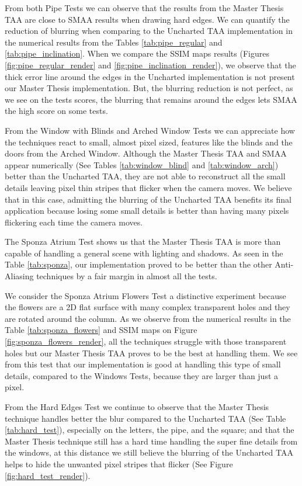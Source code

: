 \documentclass{cslthse-msc}
\begin{document}
From both Pipe Tests we can observe that the results from the Master Thesis TAA are close to SMAA results when drawing hard edges. We can quantify the reduction of blurring when comparing to the Uncharted TAA implementation in the numerical results from the Tables \ref{tab:pipe_regular} and \ref{tab:pipe_inclination}. When we compare the SSIM maps results (Figures \ref{fig:pipe_regular_render} and \ref{fig:pipe_inclination_render}), we observe that the thick error line around the edges in the Uncharted implementation is not present our Master Thesis implementation. But, the blurring reduction is not perfect, as we see on the tests scores, the blurring that remains around the edges lets SMAA the high score on some tests.

From the Window with Blinds and Arched Window Tests we can appreciate how the techniques react to small, almost pixel sized, features like the blinds and the doors from the Arched Window. Although the Master Thesis TAA and SMAA appear numerically (See Tables \ref{tab:window_blind} and \ref{tab:window_arch}) better than the Uncharted TAA, they are not able to reconstruct all the small details leaving pixel thin stripes that flicker when the camera moves. We believe that in this case, admitting the blurring of the Uncharted TAA benefits its final application because losing some small details is better than having many pixels flickering each time the camera moves.

The Sponza Atrium Test shows us that the Master Thesis TAA is more than capable of handling a general scene with lighting and shadows. As seen in the Table \ref{tab:sponza}, our implementation proved to be better than the other Anti-Aliasing techniques by a fair margin in almost all the tests.

We consider the Sponza Atrium Flowers Test a distinctive experiment because the flowers are a 2D flat surface with many complex transparent holes and they are rotated around the column. As we observe from the numerical results in the Table \ref{tab:sponza_flowers} and SSIM maps on Figure \ref{fig:sponza_flowers_render}, all the techniques struggle with those transparent holes but our Master Thesis TAA proves to be the best at handling them.  We see from this test that our implementation is good at handling this type of small details, compared to the Windows Tests, because they are larger than just a pixel. 

From the Hard Edges Test we continue to observe that the Master Thesis technique handles better the blur compared to the Uncharted TAA (See Table \ref{tab:hard_test}), especially on the letters, the pipe, and the square; and that the Master Thesis technique still has a hard time handling the super fine details from the windows, at this distance we still believe the blurring of the Uncharted TAA helps to hide the unwanted pixel stripes that flicker (See Figure \ref{fig:hard_test_render}).
\end{document}
